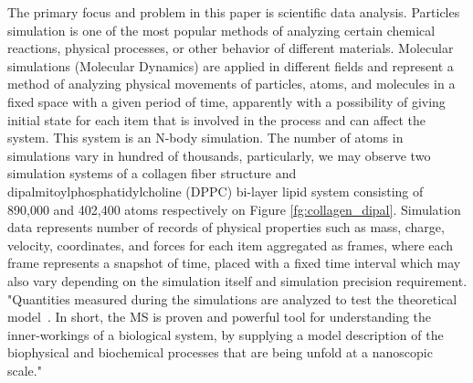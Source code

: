 \documentclass[10pt,journal,final,letterpaper,twocolumn]{IEEEtran}
\begin{document}
The primary focus and problem in this paper is scientific data analysis. Particles simulation is one of the most popular methods of analyzing certain chemical reactions, physical processes, or other behavior of different materials.
Molecular simulations (Molecular Dynamics) are applied in different fields and represent a method of analyzing physical movements of particles, atoms, and molecules in a fixed space with a given period of time, apparently with a possibility of giving initial state for each item that is involved in the process and can affect the system. This system is an N-body simulation. The number of atoms in simulations vary in hundred of thousands, particularly, we may observe two simulation systems of a collagen fiber structure and dipalmitoylphosphatidylcholine (DPPC) bi-layer lipid system consisting of 890,000 and 402,400 atoms respectively on Figure \ref{fg:collagen_dipal}. Simulation data represents number of records of physical properties such as mass, charge, velocity, coordinates, and forces for each item aggregated as frames, where each frame represents a snapshot of time, placed with a fixed time interval which may also vary depending on the simulation itself and simulation precision requirement. "Quantities measured during the simulations are analyzed to test the theoretical
model~\cite{Frenkel:api01,Landau:cup05}. In short, the MS is proven
and powerful tool for understanding the inner-workings of a
biological system, by supplying a model description of the
biophysical and biochemical processes that are being unfold at a
nanoscopic scale." \cite{mainPaper}
\end{document}
